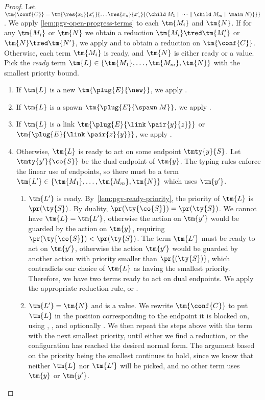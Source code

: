 \begin{proof}
  \label{prf:thm-pgv-closed-progress-confs}
  Let $\tm{\conf{C}}=\tm{\res{x_1}{x'_1}{\dots\res{x_n}{x'_n}{(\child\;M_1\parallel\dots\parallel\child\;M_m\parallel\main\;N)}}}$.
  We apply \cref{lem:pgv-open-progress-terms} to each $\tm{M_i}$ and $\tm{N}$. If for any $\tm{M_i}$ or $\tm{N}$ we obtain a reduction $\tm{M_i}\tred\tm{M'_i}$ or $\tm{N}\tred\tm{N'}$, we apply  and  to obtain a reduction on $\tm{\conf{C}}$.
  Otherwise, each term $\tm{M_i}$ is ready, and $\tm{N}$ is either ready or a value.
  Pick the \emph{ready} term $\tm{L}\in\{\tm{M_1},\dots,\tm{M_m},\tm{N}\}$ with the smallest priority bound.
  \begin{enumerate}
  \item
    If $\tm{L}$ is a new $\tm{\plug{E}{\new}}$, we apply .
  \item
    If $\tm{L}$ is a spawn $\tm{\plug{E}{\spawn\;M}}$, we apply .
  \item
    If $\tm{L}$ is a link $\tm{\plug{E}{\link\;\pair{y}{z}}}$ or $\tm{\plug{E}{\link\;\pair{z}{y}}}$, we apply .
  \item
    Otherwise, $\tm{L}$ is ready to act on some endpoint $\tmty{y}{S}$. Let $\tmty{y'}{\co{S}}$ be the dual endpoint of $\tm{y}$. The typing rules enforce the linear use of endpoints, so there must be a term $\tm{L'}\in\{\tm{M_1},\dots,\tm{M_m},\tm{N}\}$ which uses $\tm{y'}$.
    \begin{enumerate}
    \item
      $\tm{L'}$ is ready. By~\cref{lem:pgv-ready-priority}, the priority of $\tm{L}$ is $\pr(\ty{S})$. By duality, $\pr(\ty{\co{S}})=\pr(\ty{S})$.
      We cannot have $\tm{L}=\tm{L'}$, otherwise the action on $\tm{y'}$ would be guarded by the action on $\tm{y}$, requiring $\pr(\ty{\co{S}})<\pr(\ty{S})$. The term $\tm{L'}$ must be ready to act on $\tm{y'}$, otherwise the action $\tm{y'}$ would be guarded by another action with priority smaller than $\pr{(\ty{S})}$, which contradicts our choice of $\tm{L}$ as having the smallest priority. Therefore, we have two terms ready to act on dual endpoints. We apply the appropriate reduction rule, \ie {} or .
    \item
      $\tm{L'}=\tm{N}$ and is a value. We rewrite $\tm{\conf{C}}$ to put $\tm{L}$ in the position corresponding to the endpoint it is blocked on, using , , and optionally . We then repeat the steps above with the term with the next smallest priority, until either we find a reduction, or the configuration has reached the desired normal form. The argument based on the priority being the smallest continues to hold, since we know that neither $\tm{L}$ nor $\tm{L'}$ will be picked, and no other term uses $\tm{y}$ or $\tm{y'}$.
    \end{enumerate}
  \end{enumerate}
\end{proof}

